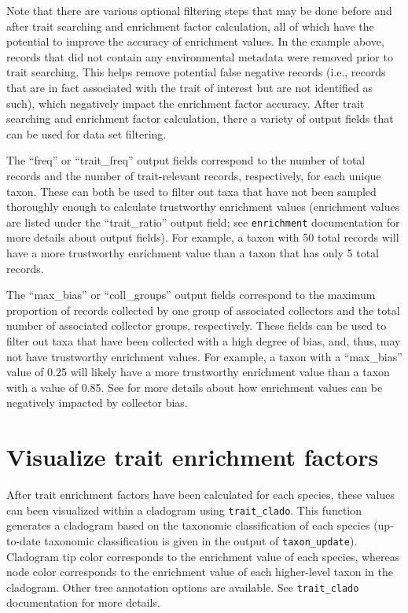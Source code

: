 \documentclass[
]{book}
\begin{document}
Note that there are various optional filtering steps that may be done before and after trait searching and enrichment factor calculation, all of which have the potential to improve the accuracy of enrichment values. In the example above, records that did not contain any environmental metadata were removed prior to trait searching. This helps remove potential false negative records (i.e., records that are in fact associated with the trait of interest but are not identified as such), which negatively impact the enrichment factor accuracy. After trait searching and enrichment factor calculation, there a variety of output fields that can be used for data set filtering.

The ``freq'' or ``trait\_freq'' output fields correspond to the number of total records and the number of trait-relevant records, respectively, for each unique taxon. These can both be used to filter out taxa that have not been sampled thoroughly enough to calculate trustworthy enrichment values (enrichment values are listed under the ``trait\_ratio'' output field; see \texttt{enrichment} documentation for more details about output fields). For example, a taxon with 50 total records will have a more trustworthy enrichment value than a taxon that has only 5 total records.

The ``max\_bias'' or ``coll\_groups'' output fields correspond to the maximum proportion of records collected by one group of associated collectors and the total number of associated collector groups, respectively. These fields can be used to filter out taxa that have been collected with a high degree of bias, and, thus, may not have trustworthy enrichment values. For example, a taxon with a ``max\_bias'' value of 0.25 will likely have a more trustworthy enrichment value than a taxon with a value of 0.85. See \citet{fungarium2021} for more details about how enrichment values can be negatively impacted by collector bias.

\hypertarget{visualize-trait-enrichment-factors}{%
\section{Visualize trait enrichment factors}\label{visualize-trait-enrichment-factors}}

After trait enrichment factors have been calculated for each species, these values can been visualized within a cladogram using \texttt{trait\_clado}. This function generates a cladogram based on the taxonomic classification of each species (up-to-date taxonomic classification is given in the output of \texttt{taxon\_update}). Cladogram tip color corresponds to the enrichment value of each species, whereas node color corresponds to the enrichment value of each higher-level taxon in the cladogram. Other tree annotation options are available. See \texttt{trait\_clado} documentation for more details.
\end{document}
